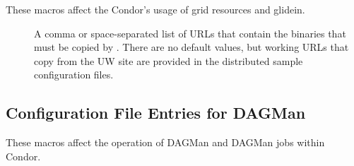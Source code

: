 These macros affect the Condor's usage of grid resources
and glidein.
\begin{description}
\item[]
  \label{param:GlideinServerURLS}
  A comma or space-separated list of URLs that contain the binaries
  that must be copied by .
  There are no default values, but working URLs that copy from the UW site
  are provided in the distributed sample configuration files.

\end{description}

\subsection{\label{sec:DAGMan-Config-File-Entries}Configuration File 
Entries for DAGMan}

These macros affect the operation of DAGMan and DAGMan
jobs within Condor.

